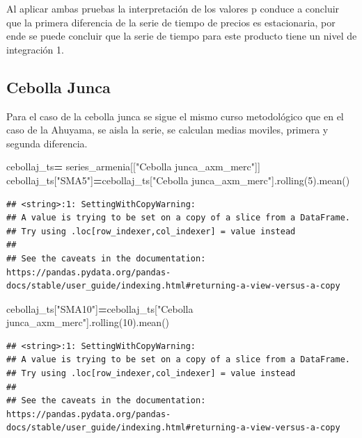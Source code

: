 \documentclass[
]{book}
\newenvironment{Shaded}{\begin{snugshade}}{\end{snugshade}}
\newcommand{\DecValTok}[1]{\textcolor[rgb]{0.00,0.00,0.81}{#1}}
\newcommand{\NormalTok}[1]{#1}
\newcommand{\OperatorTok}[1]{\textcolor[rgb]{0.81,0.36,0.00}{\textbf{#1}}}
\newcommand{\StringTok}[1]{\textcolor[rgb]{0.31,0.60,0.02}{#1}}
\begin{document}
Al aplicar ambas pruebas la interpretación de los valores p conduce a concluir que la primera diferencia de la serie de tiempo de precios es estacionaria, por ende se puede concluir que la serie de tiempo para este producto tiene un nivel de integración 1.

\hypertarget{cebolla-junca}{%
\subsection{Cebolla Junca}\label{cebolla-junca}}

Para el caso de la cebolla junca se sigue el mismo curso metodológico que en el caso de la Ahuyama, se aisla la serie, se calculan medias moviles, primera y segunda diferencia.

\begin{Shaded}
\begin{Highlighting}[]

\NormalTok{cebollaj\_ts}\OperatorTok{=}\NormalTok{ series\_armenia[[}\StringTok{"Cebolla junca\_axm\_merc"}\NormalTok{]]}
\NormalTok{cebollaj\_ts[}\StringTok{"SMA5"}\NormalTok{]}\OperatorTok{=}\NormalTok{cebollaj\_ts[}\StringTok{"Cebolla junca\_axm\_merc"}\NormalTok{].rolling(}\DecValTok{5}\NormalTok{).mean()}
\end{Highlighting}
\end{Shaded}

\begin{verbatim}
## <string>:1: SettingWithCopyWarning: 
## A value is trying to be set on a copy of a slice from a DataFrame.
## Try using .loc[row_indexer,col_indexer] = value instead
## 
## See the caveats in the documentation: https://pandas.pydata.org/pandas-docs/stable/user_guide/indexing.html#returning-a-view-versus-a-copy
\end{verbatim}

\begin{Shaded}
\begin{Highlighting}[]
\NormalTok{cebollaj\_ts[}\StringTok{"SMA10"}\NormalTok{]}\OperatorTok{=}\NormalTok{cebollaj\_ts[}\StringTok{"Cebolla junca\_axm\_merc"}\NormalTok{].rolling(}\DecValTok{10}\NormalTok{).mean()}
\end{Highlighting}
\end{Shaded}

\begin{verbatim}
## <string>:1: SettingWithCopyWarning: 
## A value is trying to be set on a copy of a slice from a DataFrame.
## Try using .loc[row_indexer,col_indexer] = value instead
## 
## See the caveats in the documentation: https://pandas.pydata.org/pandas-docs/stable/user_guide/indexing.html#returning-a-view-versus-a-copy
\end{verbatim}
\end{document}
